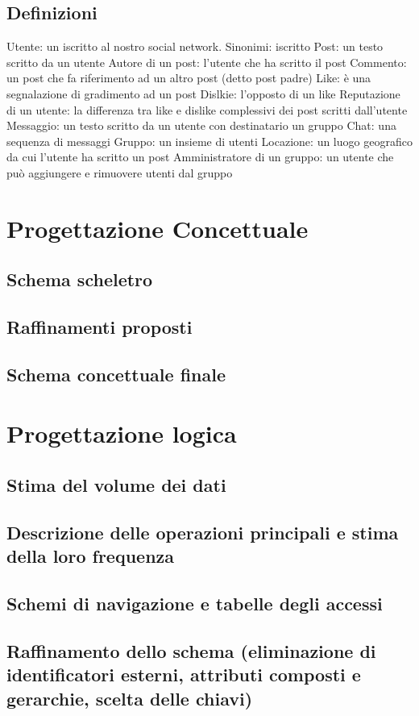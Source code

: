 \documentclass[a4paper,12pt]{report}
\begin{document}
\section{Definizioni}
Utente: un iscritto al nostro social network. Sinonimi: iscritto \newline
Post: un testo scritto da un utente 
Autore di un post: l'utente che ha scritto il post
Commento: un post che fa riferimento ad un altro post (detto post padre)
Like: è una segnalazione di gradimento ad un post
Dislkie: l'opposto di un like
Reputazione di un utente: la differenza tra like e dislike complessivi dei post scritti dall'utente
Messaggio: un testo scritto da un utente con destinatario un gruppo
Chat: una sequenza di messaggi
Gruppo: un insieme di utenti 
Locazione: un luogo geografico da cui l'utente ha scritto un post
Amministratore di un gruppo: un utente che può aggiungere e rimuovere utenti dal gruppo
\chapter{Progettazione Concettuale}
\section{Schema scheletro}
\section{Raffinamenti proposti}
\section{Schema concettuale finale}
\chapter{Progettazione logica}
\section{Stima del volume dei dati}
\section{Descrizione delle operazioni principali e stima della loro frequenza}
\section{Schemi di navigazione e tabelle degli accessi}
\section{Raffinamento dello schema (eliminazione di identificatori esterni, attributi composti e gerarchie, scelta delle chiavi)}
\end{document}
